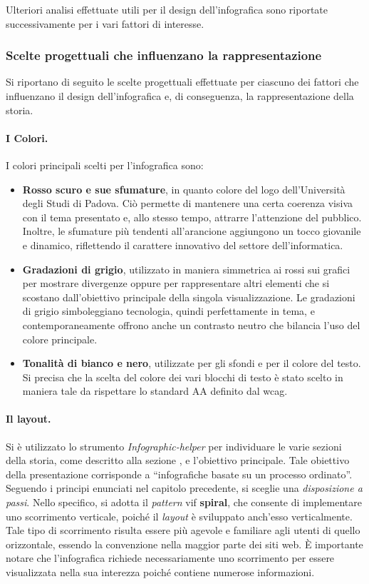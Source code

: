 Ulteriori analisi effettuate utili per il design dell'infografica sono riportate successivamente per i vari fattori di interesse.

\subsubsection{Scelte progettuali che influenzano la rappresentazione}
Si riportano di seguito le scelte progettuali effettuate per ciascuno dei fattori che influenzano il design dell'infografica
e, di conseguenza, la rappresentazione della storia.

\paragraph{I Colori.} I colori principali scelti per l'infografica sono:
\begin{itemize}
    \item \textbf{Rosso scuro e sue sfumature}, in quanto colore del logo dell'Università degli Studi di Padova. Ciò permette di mantenere una certa coerenza visiva con il
    tema presentato e, allo stesso tempo, attrarre l'attenzione del pubblico. Inoltre, le sfumature più tendenti all'arancione aggiungono un tocco giovanile e dinamico,
    riflettendo il carattere innovativo del settore dell'informatica.
    \item \textbf{Gradazioni di grigio}, utilizzato in maniera simmetrica ai rossi sui grafici per mostrare divergenze oppure per rappresentare altri elementi che si scostano 
    dall'obiettivo principale della singola visualizzazione. 
    Le gradazioni di grigio simboleggiano tecnologia, quindi perfettamente in tema, e contemporaneamente offrono anche un contrasto neutro che bilancia l'uso del colore 
    principale.
    \item \textbf{Tonalità di bianco e nero}, utilizzate per gli sfondi e per il colore del testo. 
    Si precisa che la scelta del colore dei vari blocchi di testo è stato scelto in maniera tale da rispettare lo standard AA definito dal \gls{wcag}.
\end{itemize}

\paragraph{Il layout.}
Si è utilizzato lo strumento \emph{Infographic-helper} per individuare le varie sezioni della storia, come descritto alla sezione , e l'obiettivo principale. 
Tale obiettivo della presentazione corrisponde a ``infografiche basate su un processo ordinato''. Seguendo i principi enunciati nel capitolo precedente, si sceglie una \emph{disposizione 
a passi}. Nello specifico, si adotta il \emph{pattern} \gls{vif} \textbf{spiral}, che consente di implementare uno scorrimento verticale, poiché il \emph{layout} è sviluppato anch'esso verticalmente.  
Tale tipo di scorrimento risulta essere più agevole e familiare agli utenti di quello orizzontale, essendo la convenzione nella maggior parte dei siti web. 
È importante notare che l'infografica richiede necessariamente uno scorrimento per essere visualizzata nella sua interezza poiché contiene numerose informazioni.


